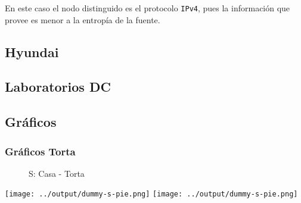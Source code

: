 \documentclass[final,narroweqnarray,inline]{ieee}
\begin{document}
  En este caso el nodo distinguido es el protocolo \texttt{IPv4}, pues la
  información que provee es menor a la entropía de la fuente. 
  \subsection{Hyundai}

  \subsection{Laboratorios DC}

  \subsection{Gráficos}
  \subsubsection*{Gráficos Torta}
    \begin{figure}[ht]\begin{center}
      \caption{S: Casa - Torta}
      \label{marto-casa-3hs-s-pie}
    \end{center}\end{figure}
  \texttt{[image: ../output/dummy-s-pie.png]}
  \texttt{[image: ../output/dummy-s-pie.png]}
    \begin{figure}[ht]\begin{center}

    \end{center}\end{figure}
\end{document}
